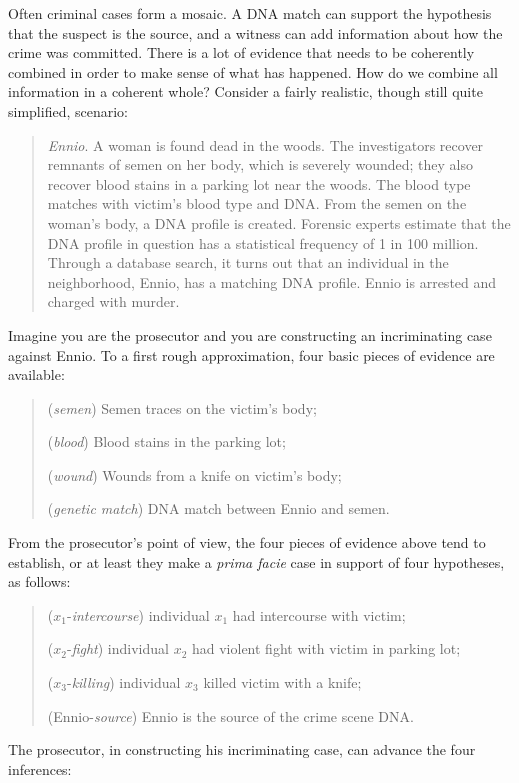 \documentclass[10pt]{article}
\begin{document}
Often criminal cases form a mosaic. A DNA  match can support the hypothesis that the suspect is the source, and a witness can add information about how the crime was committed. There is a lot of evidence that needs to be coherently combined in order to make sense of what has happened. How do we combine all information in a coherent whole? 
Consider a fairly realistic, though still quite simplified, scenario:
%
\begin{quote}
\begin{singlespace}
\textit{Ennio}. A woman is found dead in the woods. The investigators recover remnants 
of semen on her body, which is severely wounded; they also recover blood stains in a parking lot near the woods. 
The blood type matches with victim's blood type and DNA. 
From the semen on the woman's body, a DNA profile is created. 
Forensic experts estimate that the DNA profile in question has a statistical frequency of 1 in 100 million.
Through a database search, it turns out that an individual in the 
neighborhood, Ennio, has a matching DNA profile. Ennio is arrested and 
charged with murder.  
\end{singlespace}
\end{quote}
%
Imagine you are the prosecutor and you are constructing 
an incriminating case against Ennio. To a first rough approximation, four basic 
pieces of evidence are available:
%
\begin{quote}
\begin{singlespace}
(\textit{semen}) Semen traces on the victim's body;

(\textit{blood}) Blood stains in the parking lot;

(\textit{wound}) Wounds from a knife on victim's body;

(\textit{genetic match}) DNA match between Ennio and semen.
\end{singlespace}
\end{quote}
From the prosecutor's point of view,
the four pieces of evidence above tend 
to establish, or at least they make a \textit{prima facie} case in support of 
four hypotheses, as follows:
%
\begin{quote}
\begin{singlespace}

($x_1$-\textit{intercourse}) individual $x_1$ had intercourse with victim;

($x_2$-\textit{fight}) individual $x_2$ had violent fight with victim in parking lot;

($x_3$-\textit{killing}) individual $x_3$ killed victim with a knife;

(Ennio-\textit{source}) Ennio is the source of the crime scene DNA.
\end{singlespace}
\end{quote}
The prosecutor, in constructing his incriminating case, can advance 
the four inferences:
\end{document}
